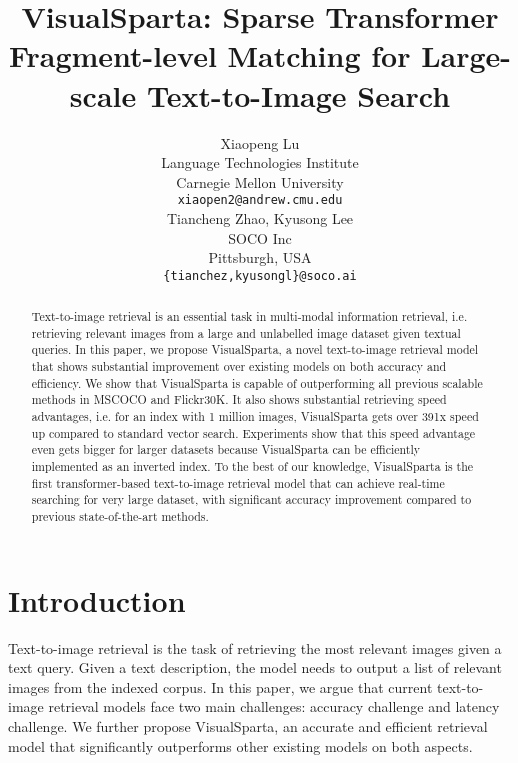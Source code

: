 \documentclass[11pt,a4paper]{article}
\title{VisualSparta: Sparse Transformer Fragment-level Matching for Large-scale Text-to-Image Search}
\author{Xiaopeng Lu \\
  Language Technologies Institute\\
  Carnegie Mellon University \\
  \texttt{xiaopen2@andrew.cmu.edu} \\\And
  Tiancheng Zhao, Kyusong Lee\\
  SOCO Inc \\ 
  Pittsburgh, USA \\
  \texttt{\{tianchez,kyusongl\}@soco.ai} \\}
\date{}
\begin{document}
\maketitle

\begin{abstract}
Text-to-image retrieval is an essential task in multi-modal information retrieval, i.e. retrieving relevant images from a large and unlabelled image dataset given textual queries. In this paper, we propose VisualSparta, a novel text-to-image retrieval model that shows substantial improvement over existing models on both accuracy and efficiency.  We show that VisualSparta is capable of outperforming all previous scalable methods in MSCOCO and Flickr30K. It also shows substantial retrieving speed advantages, i.e. for an index with 1 million images, VisualSparta gets over 391x speed up compared to standard vector search. Experiments show that this speed advantage even gets bigger for larger datasets because VisualSparta can be efficiently implemented as an inverted index. To the best of our knowledge, VisualSparta is the first transformer-based text-to-image retrieval model that can achieve real-time searching for very large dataset, with significant accuracy improvement compared to previous state-of-the-art methods.


\end{abstract}

\section{Introduction}
Text-to-image retrieval is the task of retrieving the most relevant images given a text query. Given a text description, the model needs to output a list of relevant images from the indexed corpus. In this paper, we argue that current text-to-image retrieval models face two main challenges: accuracy challenge and latency challenge. We further propose VisualSparta, an accurate and efficient retrieval model that significantly outperforms other existing models on both aspects. 
\end{document}
